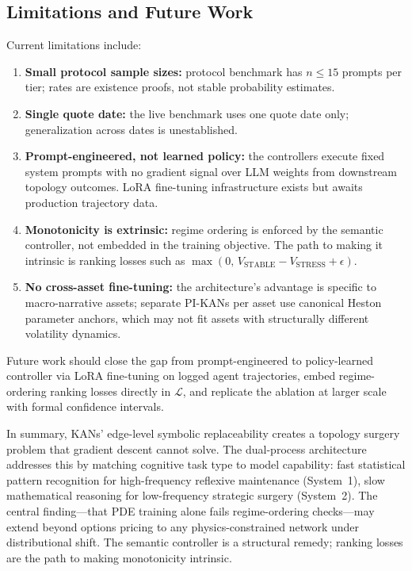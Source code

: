 \documentclass[11pt,a4paper]{article}
\begin{document}
\subsection{Limitations and Future Work}

Current limitations include:

\begin{enumerate}[nosep]
  \item \textbf{Small protocol sample sizes:} protocol benchmark has $n\leq 15$ prompts
  per tier; rates are existence proofs, not stable probability estimates.
  \item \textbf{Single quote date:} the live benchmark uses one quote date only;
  generalization across dates is unestablished.
  \item \textbf{Prompt-engineered, not learned policy:} the controllers execute fixed
  system prompts with no gradient signal over LLM weights from downstream topology
  outcomes. LoRA fine-tuning infrastructure exists but awaits production trajectory data.
  \item \textbf{Monotonicity is extrinsic:} regime ordering is enforced by the semantic
  controller, not embedded in the training objective. The path to making it intrinsic
  is ranking losses such as $\max(0,\, V_\text{STABLE} - V_\text{STRESS} + \epsilon)$.
  \item \textbf{No cross-asset fine-tuning:} the architecture's advantage is specific to
  macro-narrative assets; separate PI-KANs per asset use canonical Heston parameter
  anchors, which may not fit assets with structurally different volatility dynamics.
\end{enumerate}

Future work should close the gap from prompt-engineered to policy-learned controller
via LoRA fine-tuning on logged agent trajectories, embed regime-ordering ranking losses
directly in $\mathcal{L}$, and replicate the ablation at larger scale with formal
confidence intervals.

In summary, KANs' edge-level symbolic replaceability creates a topology surgery problem
that gradient descent cannot solve. The dual-process architecture addresses this by
matching cognitive task type to model capability: fast statistical pattern recognition
for high-frequency reflexive maintenance (System~1), slow mathematical reasoning for
low-frequency strategic surgery (System~2). The central finding---that PDE training
alone fails regime-ordering checks---may extend beyond options pricing to any
physics-constrained network under distributional shift. The semantic controller is a
structural remedy; ranking losses are the path to making monotonicity intrinsic.



\end{document}
